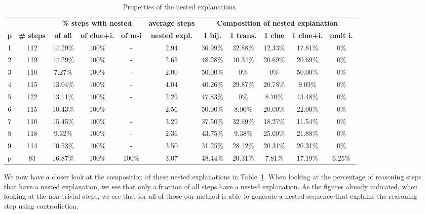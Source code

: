 \begin{table}[t]
	\centering
	\begin{tabular}{c|c|ccc|c|ccccc}
		& &  \multicolumn{3}{c|}{\textbf{\% steps with nested}} & \multicolumn{1}{c|}{\textbf{average steps}} & \multicolumn{5}{c}{\textbf{Composition of nested explanation }}\\
		\textbf{p} & \textbf{\# steps } & \textbf{of all}     & \textbf{of clue+i.} & \textbf{of m-i}          & \textbf{nested expl.} & \textbf{1 bij.} & \textbf{1 trans.} & \textbf{1 clue} & \textbf{1 clue+i.} & \textbf{mult i.} \\ \hline
		1 &      112 &  14.29\% &  100\% &  - &         2.94 &  36.99\% &   32.88\% &  12.33\% &    17.81\% &    0\% \\
		2 &      119 &  14.29\% &  100\% &  - &         2.65 &  48.28\% &   10.34\% &  20.69\% &    20.69\% &    0\% \\
		3 &      110 &   7.27\% &  100\% &  - &         2.00 &  50.00\% &    0\% &   0\% &    50.00\% &    0\% \\
		4 &      115 &  13.04\% &  100\% &  - &         4.04 &  40.26\% &   29.87\% &  20.78\% &     9.09\% &    0\% \\
		5 &      122 &  13.11\% &  100\% &  - &         2.29 &  47.83\% &    0\% &   8.70\% &    43.48\% &    0\% \\
		6 &      115 &  10.43\% &  100\% &  - &         2.56 &  50.00\% &    8.00\% &  20.00\% &    22.00\% &    0\% \\
		7 &      110 &  15.45\% &  100\% &  - &         3.29 &  37.50\% &   32.69\% &  18.27\% &    11.54\% &    0\% \\
		8 &      118 &   9.32\% &  100\% &  - &         2.36 &  43.75\% &    9.38\% &  25.00\% &    21.88\% &    0\% \\
		9 &      114 &  10.53\% &  100\% &  - &         3.50 &  31.25\% &   28.12\% &  20.31\% &    20.31\% &    0\% \\
		p &       83 &  16.87\% &  100\% &  100\% &         3.07 &  48.44\% &   20.31\% &   7.81\% &    17.19\% &    6.25\% \\
	\end{tabular}
	\caption{Properties of the nested explanations.}
	\label{table:nested_explanation}
\end{table}

We now have a closer look at the composition of these nested explanations in Table~\ref{table:nested_explanation}.
When looking at the percentage of reasoning steps that have a nested explanation, we see that only a fraction of all steps have a nested explanation. 
As the figures already indicated, when looking at the non-trivial steps, we see that for all of those our method is able to generate a nested sequence that explains the reasoning step using contradiction. 

